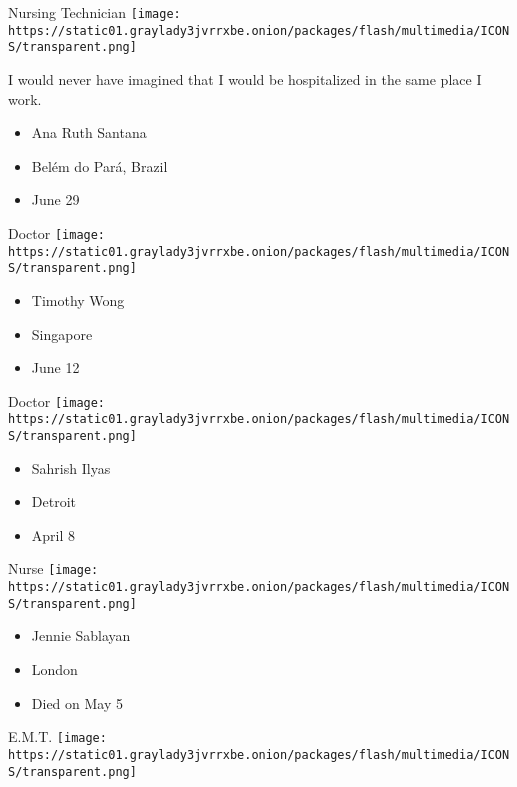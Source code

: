 \protect\hyperlink{item-ana-ruth-santana}{}

Nursing Technician
\texttt{[image: https://static01.graylady3jvrrxbe.onion/packages/flash/multimedia/ICONS/transparent.png]}

I would never have imagined that I would be hospitalized in the same
place I work.

\begin{itemize}
\tightlist
\item
  Ana Ruth Santana
\item
  Belém do Pará, Brazil
\item
  June 29
\end{itemize}

\protect\hyperlink{item-timothy-wong}{}

Doctor
\texttt{[image: https://static01.graylady3jvrrxbe.onion/packages/flash/multimedia/ICONS/transparent.png]}

\begin{itemize}
\tightlist
\item
  Timothy Wong
\item
  Singapore
\item
  June 12
\end{itemize}

\protect\hyperlink{item-sahrish-ilyas}{}

Doctor
\texttt{[image: https://static01.graylady3jvrrxbe.onion/packages/flash/multimedia/ICONS/transparent.png]}

\begin{itemize}
\tightlist
\item
  Sahrish Ilyas
\item
  Detroit
\item
  April 8
\end{itemize}

\protect\hyperlink{item-jennie-sablayan}{}

Nurse
\texttt{[image: https://static01.graylady3jvrrxbe.onion/packages/flash/multimedia/ICONS/transparent.png]}

\begin{itemize}
\tightlist
\item
  Jennie Sablayan
\item
  London
\item
  Died on May 5
\end{itemize}

\protect\hyperlink{item-courtney-bell}{}

E.M.T.
\texttt{[image: https://static01.graylady3jvrrxbe.onion/packages/flash/multimedia/ICONS/transparent.png]}

